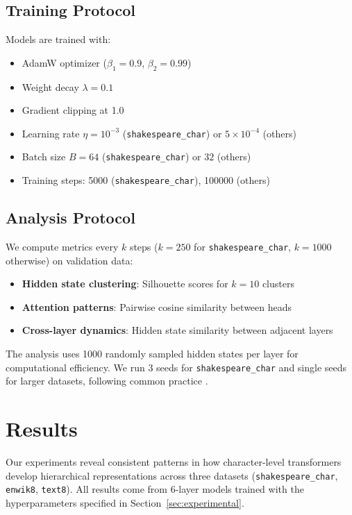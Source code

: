 \documentclass{article} %
\begin{document}
\subsection{Training Protocol}
Models are trained with:
\begin{itemize}
    \item AdamW optimizer \citep{loshchilov2017adamw} ($\beta_1=0.9$, $\beta_2=0.99$)
    \item Weight decay $\lambda=0.1$
    \item Gradient clipping at 1.0
    \item Learning rate $\eta=10^{-3}$ (\texttt{shakespeare\_char}) or $5\times10^{-4}$ (others)
    \item Batch size $B=64$ (\texttt{shakespeare\_char}) or $32$ (others)
    \item Training steps: 5000 (\texttt{shakespeare\_char}), 100000 (others)
\end{itemize}

\subsection{Analysis Protocol}
We compute metrics every $k$ steps ($k=250$ for \texttt{shakespeare\_char}, $k=1000$ otherwise) on validation data:
\begin{itemize}
    \item \textbf{Hidden state clustering}: Silhouette scores \citep{Rousseeuw1987SilhouettesAG} for $k=10$ clusters
    \item \textbf{Attention patterns}: Pairwise cosine similarity between heads
    \item \textbf{Cross-layer dynamics}: Hidden state similarity between adjacent layers
\end{itemize}

The analysis uses 1000 randomly sampled hidden states per layer for computational efficiency. We run 3 seeds for \texttt{shakespeare\_char} and single seeds for larger datasets, following common practice \citep{karpathy2023nanogpt}.

\section{Results}
\label{sec:results}

Our experiments reveal consistent patterns in how character-level transformers develop hierarchical representations across three datasets (\texttt{shakespeare\_char}, \texttt{enwik8}, \texttt{text8}). All results come from 6-layer models trained with the hyperparameters specified in Section~\ref{sec:experimental}.
\end{document}
